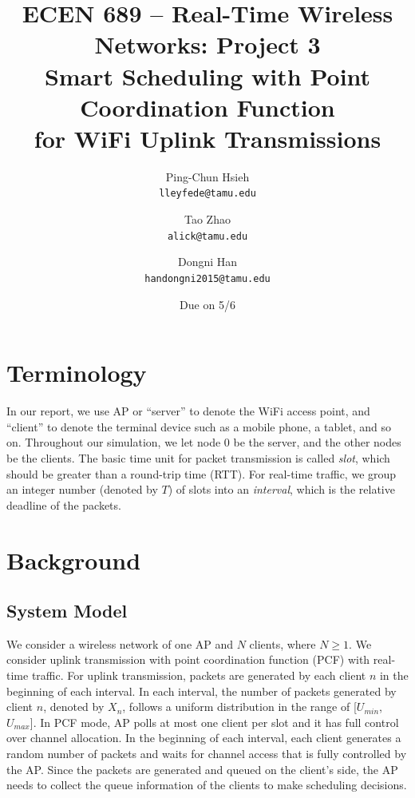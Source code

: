 \documentclass{article}
\begin{document}
\title{\bfseries ECEN 689 -- Real-Time Wireless Networks: Project 3\\
Smart Scheduling with Point Coordination Function\\
 for WiFi Uplink Transmissions}
\date{Due on 5/6}
\author{%
Ping-Chun Hsieh\\
\texttt{lleyfede@tamu.edu}
\and
Tao Zhao\\
\texttt{alick@tamu.edu}
\and
Dongni Han\\
\texttt{handongni2015@tamu.edu}
}
\maketitle

\section*{Terminology}

In our report, we use AP or ``server'' to denote the WiFi access point, and ``client'' to denote the terminal device such as a mobile phone, a tablet, and so on. Throughout our simulation, we let node $0$ be the server, and the other nodes be the clients. The basic time unit for packet transmission is called \emph{slot}, which should be greater than a round-trip time (RTT). For real-time traffic, we group an integer number (denoted by $T$) of slots into an \emph{interval}, which is the relative deadline of the packets.

\section{Background}
\subsection{System Model}
We consider a wireless network of one AP and $N$ clients, where $N\ge1$. We consider uplink transmission with point coordination function (PCF) with real-time traffic. For uplink transmission, packets are generated by each client $n$ in the beginning of each interval. In each interval, the number of packets generated by client $n$, denoted by $X_n$, follows a uniform distribution in the range of [$U_{min}$, $U_{max}$]. In PCF mode, AP polls at most one client per slot and it has full control over channel allocation. In the beginning of each interval, each client generates a random number of packets and waits for channel access that is fully controlled by the AP. Since the packets are generated and queued on the client's side, the AP needs to collect the queue information of the clients to make scheduling decisions.
\end{document}
